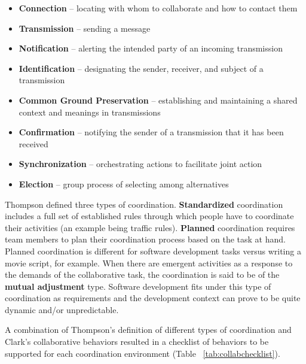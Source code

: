 \documentclass[conference]{IEEEtran}
\begin{document}
\begin{itemize}
\item \textbf{Connection} -- locating with whom to collaborate and how to contact them
\item \textbf{Transmission} -- sending a message
\item \textbf{Notification} -- alerting the intended party of an incoming transmission
\item \textbf{Identification} -- designating the sender, receiver, and subject of a transmission
\item \textbf{Common Ground Preservation} -- establishing and maintaining a shared context and meanings in transmissions
\item \textbf{Confirmation} -- notifying the sender of a transmission that it has been received
\item \textbf{Synchronization} -- orchestrating actions to facilitate joint action
\item \textbf{Election} -- group process of selecting among alternatives
\end{itemize}

Thompson \cite{Thompson67} defined three types of coordination. \textbf{Standardized} coordination includes a full set of established rules through which people have to coordinate their activities (an example being traffic rules). \textbf{Planned} coordination requires team members to plan their coordination process based on the task at hand. Planned coordination is different for software development tasks versus writing a movie script, for example. When there are emergent activities as a response to the demands of the collaborative task, the coordination is said to be of the \textbf{mutual adjustment} type. Software development fits under this type of coordination as requirements and the development context can prove to be quite dynamic and/or unpredictable.

A combination of Thompson's \cite{Thompson67} definition of different types of coordination and Clark's \cite{Clark96} collaborative behaviors resulted in a checklist of behaviors to be supported for each coordination environment (Table ~\ref{tab:collabchecklist}).
\end{document}
